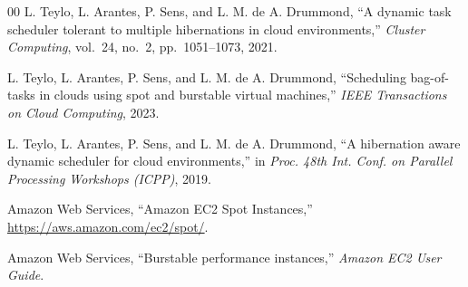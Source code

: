 \documentclass[conference]{IEEEtran}
\begin{document}
\begin{thebibliography}{00}
 L. Teylo, L. Arantes, P. Sens, and L. M. de A. Drummond,
``A dynamic task scheduler tolerant to multiple hibernations in cloud
environments,'' \emph{Cluster Computing}, vol.~24, no.~2, pp.~1051--1073, 2021.

 L. Teylo, L. Arantes, P. Sens, and L. M. de A. Drummond,
``Scheduling bag-of-tasks in clouds using spot and burstable virtual
machines,'' \emph{IEEE Transactions on Cloud Computing}, 2023.

 L. Teylo, L. Arantes, P. Sens, and L. M. de A. Drummond,
``A hibernation aware dynamic scheduler for cloud environments,'' in
\emph{Proc. 48th Int. Conf. on Parallel Processing Workshops (ICPP)}, 2019.

 Amazon Web Services, ``Amazon EC2 Spot Instances,''
\url{https://aws.amazon.com/ec2/spot/}.

 Amazon Web Services, ``Burstable performance instances,''
\emph{Amazon EC2 User Guide}.

\end{thebibliography}
\end{document}
